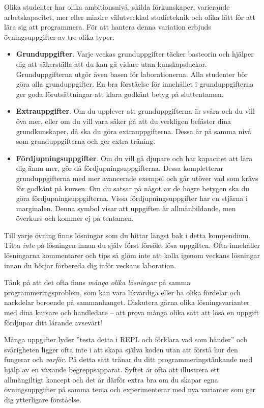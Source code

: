 Olika studenter har olika ambitionsnivå, skilda förkunskaper, varierande arbetskapacitet, mer eller mindre välutvecklad studieteknik och olika lätt för att lära sig att programmera. För att hantera denna variation erbjuds övningsuppgifter av tre olika typer:

\begin{itemize}
\item \textbf{Grunduppgifter}. Varje veckas grunduppgifter täcker basteorin och hjälper dig att säkerställa att du kan gå vidare utan kunskapsluckor. Grunduppgifterna utgör även basen för laborationerna. Alla studenter bör göra alla grunduppgifter. En bra förståelse för innehållet i grunduppgifterna ger goda förutsättningar att klara godkänt betyg på sluttentamen.

\item \textbf{Extrauppgifter}. Om du upplever att grunduppgifterna är svåra och du vill öva mer, eller om du vill vara säker på att du verkligen befäster dina grundkunskaper, då ska du göra extrauppgifterna. Dessa är på samma nivå som grunduppgifterna och ger extra träning.

\item \textbf{Fördjupningsuppgifter}. Om du vill gå djupare och har kapacitet att lära dig ännu mer, gör då fördjupningsuppgifterna. Dessa kompletterar grunduppgifterna med mer avancerade exempel och går utöver vad som krävs för godkänt på kursen. Om du satsar på något av de högre betygen ska du göra fördjupningsuppgifterna.
\Uberkurs Vissa fördjupningsuppgifter har en stjärna i marginalen. Denna symbol visar att uppgiften är allmänbildande, men överkurs och kommer ej på tentamen.

\end{itemize}


Till varje övning finns lösningar som du hittar längst bak i detta kompendium. Titta \emph{inte} på lösningen innan du själv först försökt lösa uppgiften. Ofta innehåller lösningarna kommentarer och tips så glöm inte att kolla igenom veckans lösningar innan du börjar förbereda dig inför veckans  laboration.

Tänk på att det ofta finns \emph{många olika lösningar} på samma programmeringsproblem, som kan vara likvärdiga eller ha olika fördelar och nackdelar beroende på sammanhanget. Diskutera gärna olika lösningsvarianter med dina kursare och handledare -- att prova många olika sätt att lösa en uppgift fördjupar ditt lärande avsevärt!

Många uppgifter lyder ''testa detta i REPL och förklara vad som händer'' och svårigheten ligger ofta inte i att skapa själva koden utan att förstå hur den fungerar och \emph{varför}. På detta sätt tränar du ditt programmeringstänkande med hjälp av en växande begreppsapparat. Syftet är ofta att illustrera ett allmängiltigt koncept och det är därför extra bra om du skapar egna övningsuppgifter på samma tema och experimenterar med nya varianter som ger dig ytterligare förståelse.

